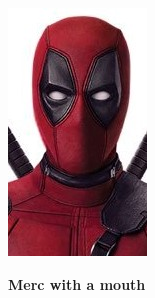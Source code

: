 \documentclass[12pt,a4paper,roman]{moderncv}
\newcommand{\nokkelkvalifikasjoner}[1]{\begin{center}\large{\textbf{#1}}\end{center}}
\begin{document}
		
	\begin{minipage}[t]{0.8\textwidth}%
		\makecvtitle
	\end{minipage}
	\begin{minipage}{0.2\textwidth}
		\includegraphics[height=0.12\textheight]{profil} %
	\end{minipage}

	\nokkelkvalifikasjoner{Merc with a mouth}

	
	
	
\end{document}
